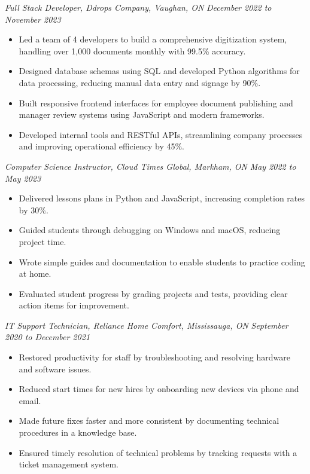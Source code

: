 \documentclass[9pt]{src/developercv}
\begin{document}
  \vspace{1.0\baselineskip}

  \textit{Full Stack Developer, Ddrops Company, Vaughan, ON} \hfill \textit{December 2022 to November 2023}
  \begin{itemize}[leftmargin=2em, rightmargin=2.5em, itemsep=0.1em]
    \item Led a team of 4 developers to build a comprehensive digitization system, handling over 1,000 documents monthly with 99.5\% accuracy.
    \item Designed database schemas using SQL and developed Python algorithms for data processing, reducing manual data entry and signage by 90\%.
    \item Built responsive frontend interfaces for employee document publishing and manager review systems using JavaScript and modern frameworks.
    \item Developed internal tools and RESTful APIs, streamlining company processes and improving operational efficiency by 45\%.
  \end{itemize}

  \vspace{1.0\baselineskip}

  \textit{Computer Science Instructor, Cloud Times Global, Markham, ON} \hfill \textit{May 2022 to May 2023}
  \begin{itemize}[leftmargin=2em, rightmargin=2.5em, itemsep=0.1em]
    \item Delivered lessons plans in Python and JavaScript, increasing completion rates by 30\%.
    \item Guided students through debugging on Windows and macOS, reducing project time.
    \item Wrote simple guides and documentation to enable students to practice coding at home.
    \item Evaluated student progress by grading projects and tests, providing clear action items for improvement.
  \end{itemize}

  \vspace{1.0\baselineskip}

  \textit{IT Support Technician, Reliance Home Comfort, Mississauga, ON} \hfill\textit{September 2020 to December 2021}
  \begin{itemize}[leftmargin=2em, rightmargin=2.5em, itemsep=0.1em]
    \item Restored productivity for staff by troubleshooting and resolving hardware and software issues.
    \item Reduced start times for new hires by onboarding new devices via phone and email.
    \item Made future fixes faster and more consistent by documenting technical procedures in a knowledge base.
    \item Ensured timely resolution of technical problems by tracking requests with a ticket management system.
  \end{itemize}
\end{document}

